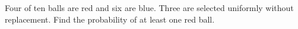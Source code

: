 Four of ten balls are red and six are blue. Three are selected uniformly without replacement. Find the probability of at least one red ball.
